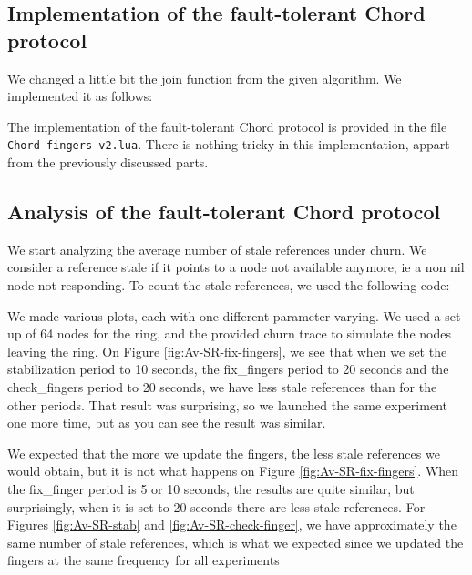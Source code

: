 \documentclass[a4paper, 11pt]{article}
\theoremstyle{plain}
\theoremstyle{definition}
\begin{document}
  \subsection{Implementation of the fault-tolerant Chord protocol}
  \label{sec:impl-ft-chord}
  
    We changed a little bit the join function from the given algorithm. We implemented it as follows:

    

    The implementation of the fault-tolerant Chord protocol is provided in the file
    \texttt{Chord-fingers-v2.lua}. There is nothing tricky in this implementation, appart from the previously
    discussed parts. 
    
    
  \subsection{Analysis of the fault-tolerant Chord protocol}
  \label{sec:eval-ft-chord}

    We start analyzing the average number of stale references under churn. We consider a reference stale if it
    points to a node not available anymore, ie a non nil node not responding. To count the stale references,
    we used the following code:

    
    
    We made various plots, each with
    one different parameter varying. We used a set up of 64 nodes for the ring, and the provided churn trace
    to simulate the nodes leaving the ring. On Figure \ref{fig:Av-SR-fix-fingers}, we see that when we set the
    stabilization period to 10 seconds, the fix\_fingers period to 20 seconds and the check\_fingers period to
    20 seconds, we have less stale references than for the other periods. That result was surprising, so we
    launched the same experiment one more time, but as you can see the result was similar.

    We expected that the more we update the fingers, the less stale references we would obtain, but it is not
    what happens on Figure \ref{fig:Av-SR-fix-fingers}. When the fix\_finger period is 5 or 10 seconds, the
    results are quite similar, but surprisingly, when it is set to 20 seconds there are less stale
    references. For Figures \ref{fig:Av-SR-stab} and \ref{fig:Av-SR-check-finger}, we have approximately the
    same number of stale references, which is what we expected since we updated the fingers at the same
    frequency for all experiments
\end{document}
